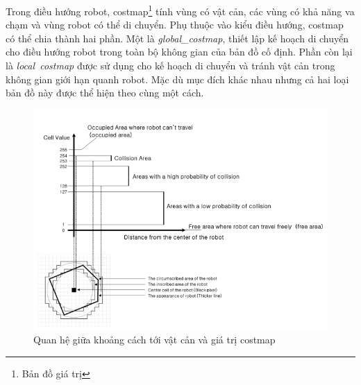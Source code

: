 Trong điều hướng robot, costmap\footnote{Bản đồ giá trị} tính vùng có vật cản, các vùng có khả năng va chạm và vùng robot có thể di chuyển. Phụ thuộc vào kiểu điều hướng, costmap có thể chia thành hai phần. Một là \textit{global\_costmap}, thiết lập kế hoạch di chuyển cho điều hướng robot trong toàn bộ không gian của bản đồ cố định. Phần còn lại là \textit{local\ costmap} được sử dụng cho kế hoạch di chuyển và tránh vật cản trong không gian giới hạn quanh robot. Mặc dù mục đích khác nhau nhưng cả hai loại bản đồ này được thể hiện theo cùng một cách.

\begin{figure}[htbp]
  \centering
  \includegraphics[width=0.8\linewidth]{figures/relationship-distanceToObstacle-vs-costmapValue.png}
  \caption{Quan hệ giữa khoảng cách tới vật cản và giá trị costmap}
  \label{fig:relationship-distanceToObstacle-vs-costmapValue}
\end{figure}

